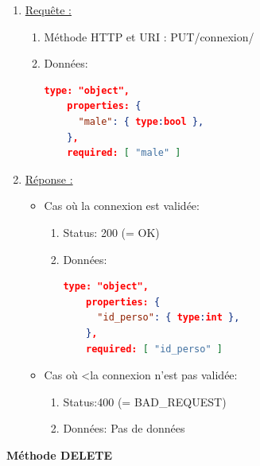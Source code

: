 \documentclass[11pt, a4paper]{article}
\begin{document}
  \begin{enumerate}
   \item \underline{Requête :}
    \begin{enumerate}
     \item Méthode HTTP et URI : PUT/connexion/
     \item Données:
	\begin{lstlisting}[language=JSON]
	type: "object",
	properties: {
	  "male": { type:bool },
	},
	required: [ "male" ]
	\end{lstlisting}
	     
    \end{enumerate}

   \item \underline{Réponse :}
   \begin{itemize}
    \item Cas où la connexion est validée:
    \begin{enumerate}
     \item Status: 200 (= OK)
     \item Données:
	\begin{lstlisting}[language=JSON]
	type: "object",
	properties: {
	  "id_perso": { type:int },
	},
	required: [ "id_perso" ]
	\end{lstlisting} 
    \end{enumerate}

    \item Cas où <la connexion n'est pas validée:
    \begin{enumerate}
     \item Status:400 (= BAD\_REQUEST)
     \item Données: Pas de données\\
    \end{enumerate}
    
   \end{itemize}

  \end{enumerate}
  
  \textbf{Méthode DELETE}
  
\end{document}
